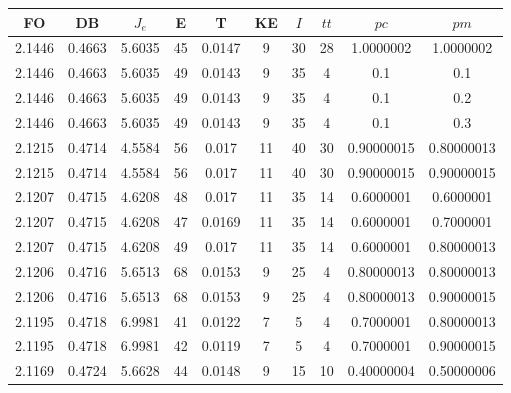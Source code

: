 \begin{table}[h!]
    \footnotesize
    \begin{center}
        \begin{tabular}{|c|c|c|c|c|c|c|c|c|c|}
        \hline
            {\bf FO} & {\bf DB} & $J_e$ & {\bf E} & {\bf T} & {\bf KE} & $I$ & $tt$ & $pc$ & $pm$ \\
        \hline
        \hline
            2.1446 & 0.4663  & 5.6035 & 45 & 0.0147 & 9 & 30 & 28 & 1.0000002 & 1.0000002\\
        \hline
        \hline
            2.1446 & 0.4663  & 5.6035 & 49 & 0.0143 & 9 & 35 & 4 & 0.1 & 0.1\\
        \hline
        \hline
            2.1446 & 0.4663  & 5.6035 & 49 & 0.0143 & 9 & 35 & 4 & 0.1 & 0.2\\
        \hline
        \hline
            2.1446 & 0.4663  & 5.6035 & 49 & 0.0143 & 9 & 35 & 4 & 0.1 & 0.3\\
        \hline
        \hline
            2.1215 & 0.4714  & 4.5584 & 56 & 0.017 & 11 & 40 & 30 & 0.90000015 & 0.80000013\\
        \hline
        \hline
            2.1215 & 0.4714  & 4.5584 & 56 & 0.017 & 11 & 40 & 30 & 0.90000015 & 0.90000015\\
        \hline
        \hline
            2.1207 & 0.4715  & 4.6208 & 48 & 0.017 & 11 & 35 & 14 & 0.6000001 & 0.6000001\\
        \hline
        \hline
            2.1207 & 0.4715  & 4.6208 & 47 & 0.0169 & 11 & 35 & 14 & 0.6000001 & 0.7000001\\
        \hline
        \hline
            2.1207 & 0.4715  & 4.6208 & 49 & 0.017 & 11 & 35 & 14 & 0.6000001 & 0.80000013\\
        \hline
        \hline
            2.1206 & 0.4716  & 5.6513 & 68 & 0.0153 & 9 & 25 & 4 & 0.80000013 & 0.80000013\\
        \hline
        \hline
            2.1206 & 0.4716  & 5.6513 & 68 & 0.0153 & 9 & 25 & 4 & 0.80000013 & 0.90000015\\
        \hline
        \hline
            2.1195 & 0.4718  & 6.9981 & 41 & 0.0122 & 7 & 5 & 4 & 0.7000001 & 0.80000013\\
        \hline
        \hline
            2.1195 & 0.4718  & 6.9981 & 42 & 0.0119 & 7 & 5 & 4 & 0.7000001 & 0.90000015\\
        \hline
        \hline
            2.1169 & 0.4724  & 5.6628 & 44 & 0.0148 & 9 & 15 & 10 & 0.40000004 & 0.50000006\\

\end{tabular}
\end{center}
\end{table}
